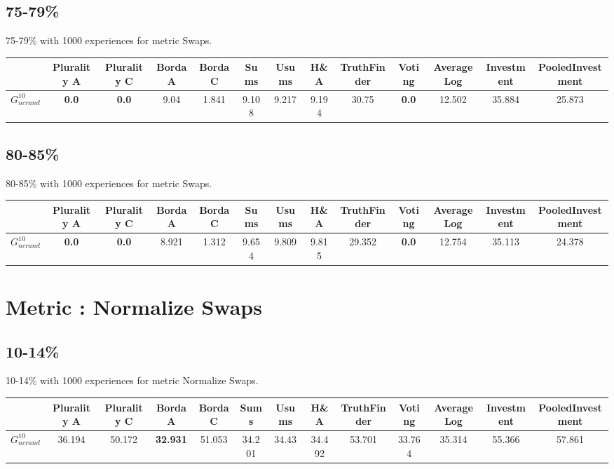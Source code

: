 \documentclass{article}
\newcommand{\graph}[2]{$G_{#1}^{#2}$}
\begin{document}
\subsection{75-79\%}

75-79\% with 1000 experiences for metric Swaps.

\noindent\begin{tabular}{|l|c|c|c|c|c|c|c|c|c|c|c|c|}
\hline
& Plurality A& Plurality C& Borda A& Borda C& Sums& Usums& H\&A& TruthFinder& Voting& AverageLog& Investment& PooledInvestment\\
\hline
\graph{ncrand}{10} &\textbf{0.0}&\textbf{0.0}&9.04&1.841&9.108&9.217&9.194&30.75&\textbf{0.0}&12.502&35.884&25.873\\
\hline
\end{tabular}
\newpage

\subsection{80-85\%}

80-85\% with 1000 experiences for metric Swaps.

\noindent\begin{tabular}{|l|c|c|c|c|c|c|c|c|c|c|c|c|}
\hline
& Plurality A& Plurality C& Borda A& Borda C& Sums& Usums& H\&A& TruthFinder& Voting& AverageLog& Investment& PooledInvestment\\
\hline
\graph{ncrand}{10} &\textbf{0.0}&\textbf{0.0}&8.921&1.312&9.654&9.809&9.815&29.352&\textbf{0.0}&12.754&35.113&24.378\\
\hline
\end{tabular}
\newpage
\newpage
\section{Metric : Normalize Swaps}

\newpage

\subsection{10-14\%}

10-14\% with 1000 experiences for metric Normalize Swaps.

\noindent\begin{tabular}{|l|c|c|c|c|c|c|c|c|c|c|c|c|}
\hline
& Plurality A& Plurality C& Borda A& Borda C& Sums& Usums& H\&A& TruthFinder& Voting& AverageLog& Investment& PooledInvestment\\
\hline
\graph{ncrand}{10} &36.194&50.172&\textbf{32.931}&51.053&34.201&34.43&34.492&53.701&33.764&35.314&55.366&57.861\\
\hline
\end{tabular}
\newpage
\end{document}
